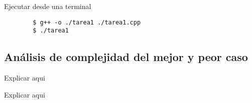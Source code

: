 \documentclass{article}
\begin{document}
Ejecutar desde una terminal

\begin{commandline}
	\begin{verbatim}
		$ g++ -o ./tarea1 ./tarea1.cpp
		$ ./tarea1
	\end{verbatim}
\end{commandline}



\newpage
\subsection{Análisis de complejidad del mejor y peor caso}
\begin{warn}
  Explicar aqui
\end{warn}
\begin{warn}
  Explicar aqui
\end{warn}
\end{document}
